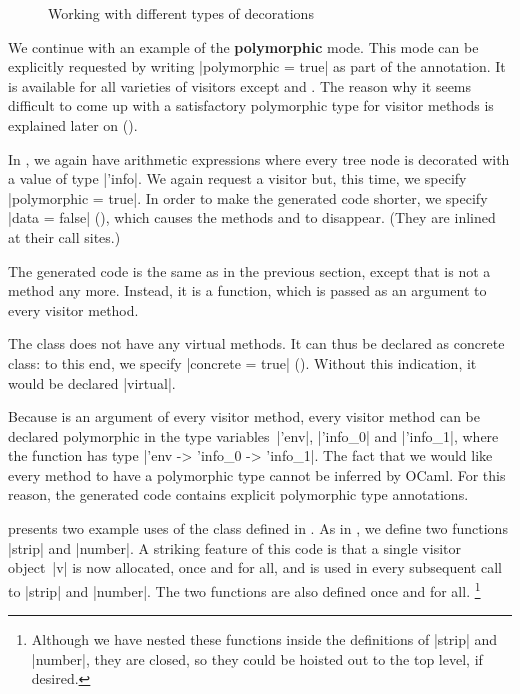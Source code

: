 \documentclass[11pt,a4paper,twoside]{article}
\renewcommand{\emph}[1]{\textbf{#1}}
\begin{document}
\begin{figure}[p]
\caption{Working with different types of decorations}
\label{fig:expr_info_polymorphic_use}
\end{figure}

We continue with an example of the \emph{polymorphic} mode. This mode can be
explicitly requested by writing \oc|polymorphic = true| as part of the
\derivingvisitors annotation. It is available for all varieties of visitors
except \fold and \foldtwo. The reason why it seems difficult to come up with
a satisfactory polymorphic type for \fold visitor methods is explained later
on ().

In , we again have arithmetic expressions
where every tree node is decorated with a value of type \oc|'info|. We again
request a \map visitor but, this time, we specify \oc|polymorphic = true|.
%
In order to make the generated code shorter, we specify \oc|data = false|
(), which causes the methods  and
 to disappear. (They are inlined at their call sites.)

The generated code is the same as in the previous section,
except that  is not a method any more. Instead, it is
a function, which is passed as an argument to every visitor method.

The class \map does not have any virtual methods. It can thus be declared as
concrete class: to this end, we specify
%
\oc|concrete = true| (). Without this indication, it would be
declared \oc|virtual|.

Because  is an argument of every visitor method,
every visitor method can be declared polymorphic in the type variables~\oc|'env|,
\oc|'info_0| and \oc|'info_1|,
where the function  has type \oc|'env -> 'info_0 -> 'info_1|.
%
The fact that we would like every method to have a polymorphic type cannot
be inferred by OCaml. For this reason, the generated code contains explicit
polymorphic type annotations.

 presents two example uses of the class
\map defined in . As in
, we define two functions \oc|strip| and \oc|number|.
A striking feature of this code is that a single visitor object~\oc|v| is now
allocated, once and for all, and is used in every subsequent call to \oc|strip|
and \oc|number|. The two  functions are also defined once
and for all.%
%
\footnote{Although we have nested these functions inside the definitions of
  \oc|strip| and \oc|number|, they are closed, so they could be hoisted out to
  the top level, if desired.}
\end{document}
